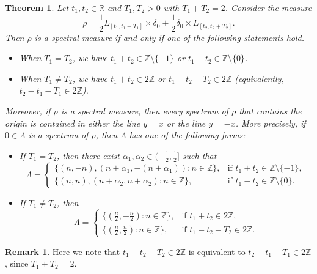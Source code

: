 \documentclass[12pt,a4paper,intlimits,sumlimits]{amsart}
\theoremstyle{plain}
\newtheorem{theorem}{Theorem}
\theoremstyle{definition}
\newtheorem{remark}{Remark}
\newcounter{rem}
\begin{document}
\begin{theorem}\label{twoline1}
Let $t_1,t_2\in\mathbb{R}$ and  $T_1,T_2>0$ with $T_1+T_2=2$. Consider the measure
\[
\rho=\frac{1}{2}L_{[t_1, t_1+T_1]}\times\delta_0+\frac{1}{2}\delta_0\times L_{[t_2, t_2+T_2]}.
\]
Then $\rho$ is a spectral measure if and only if one of the following  statements hold.
\begin{itemize}
\item[(I)] When $T_1=T_2$, we have  $t_1+t_2 \in\mathbb{Z} \setminus\{-1\}$ or $t_1-t_2 \in \mathbb{Z} \setminus\{0\}$.
\item[(II)] When $T_1\neq T_2$, we have $t_1+t_2\in 2\mathbb{Z}$ or $t_1-t_2-T_2\in 2\mathbb{Z}$ (equivalently, $t_2-t_1-T_1\in 2\mathbb{Z}$).
\end{itemize}
Moreover, if $\rho$ is a spectral measure, then every spectrum of $\rho$ that contains the origin is contained in either the line $y=x$ or the line $y=-x$. More precisely, if $0\in\Lambda$ is a spectrum of $\rho$, then $\Lambda$ has one of the following forms:
\begin{itemize}
\item[(I)] If $T_1=T_2$, then there exist $\alpha_1, \alpha_2\in(-\tfrac{1}{2}, \tfrac{1}{2}]$ such that
\begin{equation}\label{line-1}
 \Lambda=\begin{cases}
\{(n, -n),(n+\alpha_1, -(n+\alpha_1)): n\in \mathbb{Z}\}, & \text{if } t_1+t_2\in  \mathbb{Z}\setminus\{-1\},\\[6pt]
\{(n,  n),(n+\alpha_2,  n+\alpha_2): n\in \mathbb{Z}\}, & \text{if } t_1-t_2 \in  \mathbb{Z}\setminus\{0\}.
\end{cases}
\end{equation}
\item[(II)] If $T_1\neq T_2$, then
\begin{equation}\label{line-2}
 \Lambda=\begin{cases}
\{(\tfrac{n}{2}, -\tfrac{n}{2}): n\in \mathbb{Z}\}, & \text{if } t_1+t_2\in 2\mathbb{Z},\\[6pt]
\{(\tfrac{n}{2},  \tfrac{n}{2}): n\in \mathbb{Z}\}, & \text{if } t_1-t_2-T_2\in 2\mathbb{Z}.
\end{cases}
\end{equation}
\end{itemize}
\end{theorem}

\begin{remark}\label{T2}
Here we note that $t_1-t_2-T_2\in 2\mathbb{Z}$ is equivalent to $t_2-t_1-T_1\in 2\mathbb{Z}$, since $T_1+T_2=2$.
\end{remark}
 
\end{document}
